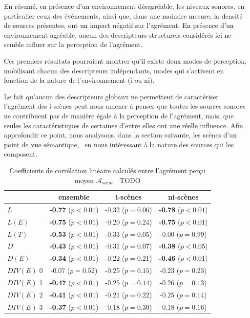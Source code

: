 En résumé, en présence d'un environnement désagréable, les niveaux sonores, en particulier ceux des événements, ainsi que, dans une moindre mesure, la densité de sources présentes, ont un impact négatif sur l'agrément. En présence d'un environnement agréable, aucun des descripteurs structurels considérés ici ne semble influer sur la perception de l'agrément. 

Ces premiers résultats pourraient montrer qu'il existe deux modes de perception, mobilisant chacun des descripteurs indépendants, modes qui s'activent en fonction de la nature de l'environnement (i ou ni).

Le fait qu'aucun des descripteurs globaux ne permettent de caractériser l'agrément des i-scènes peut nous amener à penser que toutes les sources sonores ne contribuent pas de manière égale à la perception de l'agrément, mais, que seules les caractéristiques de certaines d'entre elles ont une réelle influence. Afin approfondir ce point, nous analysons, dans la section suivante, les scènes d'un point de vue sémantique, \ie~en nous intéressant à la nature des sources qui les composent. \\


\begin{table}[t]
\centering
\begin{tabular}{l c c c} 
            & ensemble                     & i-scènes                   & ni-scènes    \\
\hline
$L$            & \textbf{-0.77} ($p<0.01$)    & -0.32 ($p=0.06$)           & \textbf{-0.78} ($p<0.01$)\\
$L(E)$         & \textbf{-0.75} ($p<0.01$)    & -0.20 ($p=0.24$)           & \textbf{-0.75} ($p<0.01$)\\
$L(T)$         & \textbf{-0.53} ($p<0.01$)    & -0.33 ($p=0.05$)           &  -0.00 ($p=0.99$) \\
$D$            & \textbf{-0.43} ($p<0.01$)    & -0.31 ($p=0.07$)           & \textbf{-0.38} ($p<0.05$)\\
$D(E)$         & \textbf{-0.34} ($p<0.01$)    & -0.22 ($p=0.21$)           & \textbf{-0.46} ($p<0.01$)\\
$DIV(E)$ 0     &          -0.07 ($p=0.52$)    & -0.25 ($p=0.15$)           & -0.23 ($p=0.23$)\\
$DIV(E)$ 1     & \textbf{-0.47} ($p<0.01$)    & -0.25 ($p=0.14$)           & -0.26 ($p=0.13$)\\
$DIV(E)$ 2     & \textbf{-0.41} ($p<0.01$)    & -0.21 ($p=0.22$)           & -0.25 ($p=0.14$)\\
$DIV(E)$ 3     & \textbf{-0.37} ($p<0.01$)    & -0.18 ($p=0.30$)           & -0.18 ($p=0.16$)\\
\hline
\end{tabular}
\vspace{0.5mm}
\caption{Coefficients de corrélation linéaire calculés entre l'agrément perçu moyen $\mathcal{A}_{scene}$ \vs~TODO}
\label{tab:corrStructA}
\end{table}

